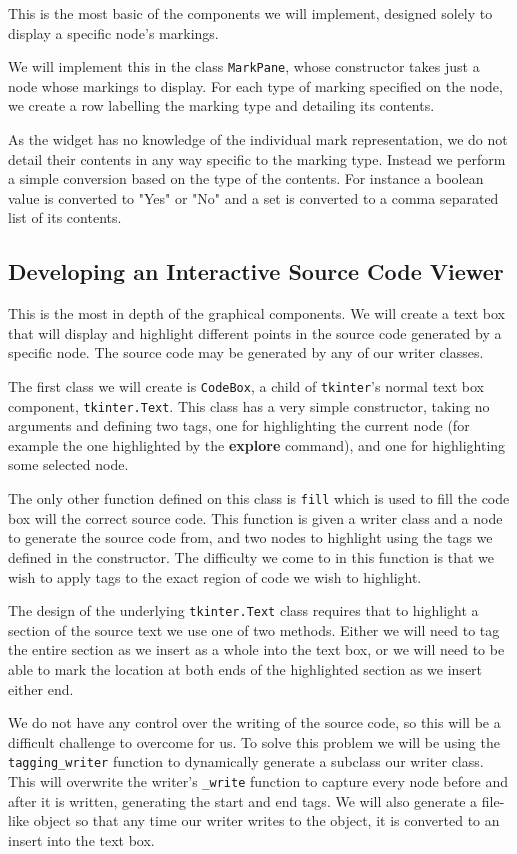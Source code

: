 \documentclass[twoside,a4paper]{report}
\begin{document}
This is the most basic of the components we will implement, designed solely to display a specific node's markings.

We will implement this in the class \texttt{MarkPane}, whose constructor takes just a node whose markings to display. For each type of marking specified on the
node, we create a row labelling the marking type and detailing its contents.

As the widget has no knowledge of the individual mark representation, we do not detail their contents in any way specific to the marking type. Instead we perform
a simple conversion based on the type of the contents. For instance a boolean value is converted to "Yes" or "No" and a set is converted to a comma separated
list of its contents.

\subsection{Developing an Interactive Source Code Viewer}

This is the most in depth of the graphical components. We will create a text box that will display and highlight different points in the source code generated
by a specific node. The source code may be generated by any of our writer classes.

The first class we will create is \texttt{CodeBox}, a child of \texttt{tkinter}'s normal text box component, \texttt{tkinter.Text}. This class has a very
simple constructor, taking no arguments and defining two tags, one for highlighting the current node (for example the one highlighted by the
\textbf{explore} command), and one for highlighting some selected node.

The only other function defined on this class is \texttt{fill} which is used to fill the code box will the correct source code. This function is given a
writer class and a node to generate the source code from, and two nodes to highlight using the tags we defined in the constructor. The difficulty we come to
in this function is that we wish to apply tags to the exact region of code we wish to highlight.

The design of the underlying \texttt{tkinter.Text} class requires that to highlight a section of the source text we use one of two methods. Either we will
need to tag the entire section as we insert as a whole into the text box, or we will need to be able to mark the location at both ends of the highlighted
section as we insert either end.

We do not have any control over the writing of the source code, so this will be a difficult challenge to overcome for us. To solve this problem we will be
using the \texttt{tagging\_writer} function to dynamically generate a subclass our writer class. This will overwrite the writer's \texttt{\_write} function
to capture every node before and after it is written, generating the start and end tags. We will also generate a file-like object so that any time our writer
writes to the object, it is converted to an insert into the text box.
\end{document}
